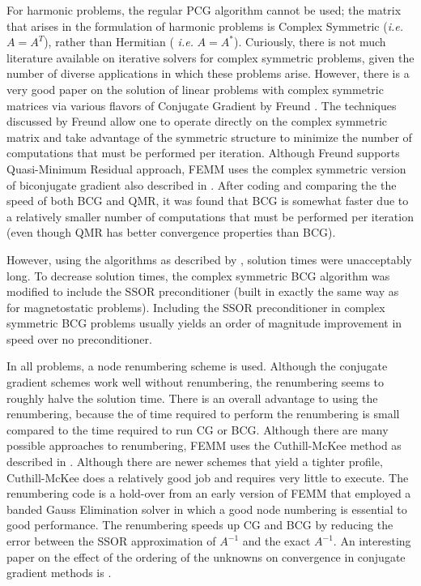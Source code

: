 \documentclass[12pt]{report}
\begin{document}
For harmonic problems, the regular PCG algorithm cannot be used;
the matrix that arises in the formulation of harmonic problems is
Complex Symmetric ({\em i.e.} $A=A^T$), rather than Hermitian ({\em
i.e.} $A=A^*$). Curiously, there is not much literature available
on iterative solvers for complex symmetric problems, given the
number of diverse applications in which these problems arise.
However, there is a very good paper on the solution of linear
problems with complex symmetric matrices via various flavors of
Conjugate Gradient by Freund \cite{freund}. The techniques
discussed by Freund allow one to operate directly on the complex
symmetric matrix and take advantage of the symmetric structure to
minimize the number of computations that must be performed per
iteration. Although Freund supports Quasi-Minimum Residual
approach, FEMM uses the complex symmetric version of biconjugate
gradient also described in \cite{freund}. After coding and
comparing the the speed of both BCG and QMR, it was found that BCG
is somewhat faster due to a relatively smaller number of
computations that must be performed per iteration (even though QMR
has better convergence properties than BCG).

However, using the algorithms as described by \cite{freund},
solution times were unacceptably long.  To decrease solution times,
the complex symmetric BCG algorithm was modified to include the
SSOR preconditioner (built in exactly the same way as for
magnetostatic problems).  Including the SSOR preconditioner in
complex symmetric BCG problems usually yields an order of magnitude
improvement in speed over no preconditioner.

In all problems, a node renumbering scheme is used.  Although the
conjugate gradient schemes work well without renumbering, the
renumbering seems to roughly halve the solution time.  There is an
overall advantage to using the renumbering, because the of time
required to perform the renumbering is small compared to the time
required to run CG or BCG.  Although there are many possible
approaches to renumbering, FEMM uses the Cuthill-McKee method as
described in \cite{Hoole}. Although there are newer schemes that
yield a tighter profile, Cuthill-McKee does a relatively good job
and requires very little to execute. The renumbering code is a
hold-over from an early version of FEMM that employed a banded
Gauss Elimination solver in which a good node numbering is
essential to good performance.  The renumbering speeds up CG and
BCG by reducing the error between the SSOR approximation of
$A^{-1}$ and the exact $A^{-1}$.  An interesting paper on the
effect of the ordering of the unknowns on convergence in conjugate
gradient methods is \cite{Daze}.
\end{document}
